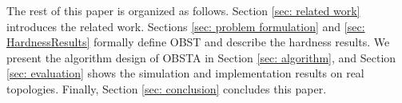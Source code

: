 \documentclass[10pt, conference, letterpaper]{IEEEtran}
\theoremstyle{definition}
\begin{document}




The rest of this paper is organized as follows. Section \ref{sec: related work} introduces the related work. Sections \ref{sec: problem formulation} and \ref{sec: HardnessResults} formally define OBST and describe the hardness results. We present the algorithm design of OBSTA in Section \ref{sec: algorithm}, and Section \ref{sec: evaluation} shows the simulation and implementation results on real topologies. Finally, Section \ref{sec: conclusion} concludes this paper.



\end{document}
